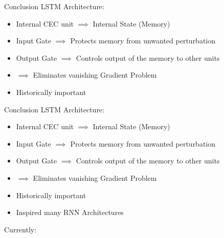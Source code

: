 \documentclass[10pt, aspectratio=169]{beamer}
\begin{document}
\begin{frame}[t]{Conclusion}
LSTM Architecture:
\begin{itemize}
    \item Internal CEC unit \begin{math}\implies \end{math} Internal State (Memory)
    \item Input Gate \begin{math}\implies\end{math} Protects memory from unwanted perturbation
    \item Output Gate \begin{math}\implies\end{math} Controls output of the memory to other units
    \item \begin{math}\implies\end{math} Eliminates vanishing Gradient Problem
    \item Historically important 
\end{itemize}
\end{frame}

\begin{frame}[t]{Conclusion}
LSTM Architecture:
\begin{itemize}
    \item Internal CEC unit \begin{math}\implies \end{math} Internal State (Memory)
    \item Input Gate \begin{math}\implies\end{math} Protects memory from unwanted perturbation
    \item Output Gate \begin{math}\implies\end{math} Controls output of the memory to other units
    \item \begin{math}\implies\end{math} Eliminates vanishing Gradient Problem
    \item Historically important 
    \item Inspired many RNN Architectures
\end{itemize}
Currently:
\end{frame}
\end{document}
